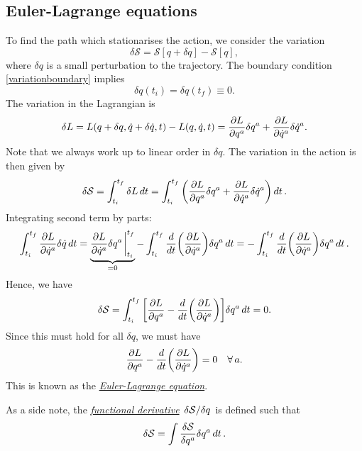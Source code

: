 \documentclass{article}
\begin{document}
\subsection{Euler-Lagrange equations}
To find the path which stationarises the action, we consider the variation
\begin{equation}
    \delta \mathcal{S} = \mathcal{S}[q + \delta q] - \mathcal{S}[q],
\end{equation}
where $\delta q$ is a small perturbation to the trajectory. The boundary condition \eqref{variationboundary} implies
\begin{equation}
    \delta q(t_i) = \delta q(t_f) \equiv 0.
\end{equation}
The variation in the Lagrangian is
\begin{equation}
    \delta L = L(q+\delta q, \dot{q} + \delta \dot{q}, t) - L(q,\dot{q},t) = \pdv{L}{q^a} \delta q^a + \pdv{L}{\dot{q}^a}\delta \dot{q}^a.
\end{equation}
Note that we always work up to linear order in $ \delta q $. The variation in the action is then given by
\begin{equation}
    \delta \mathcal{S} = \int_{t_i}^{t_f} \delta L\dd{t} = \int_{t_i}^{t_f} \qty(\pdv{L}{q^a} \delta q^a + \pdv{L}{\dot{q}^a}\delta \dot{q}^a) \dd{t}.
\end{equation}
Integrating second term by parts:
\[
    \int_{t_i}^{t_f} \pdv{L}{\dot{q}^a} \delta \dot{q} \dd{t} = \underbrace{\pdv{L}{\dot{q}^a} \delta q^a \eval_{t_i}^{t_f}}_{=0} - \int_{t_i}^{t_f} \dv{}{t}\qty(\pdv{L}{\dot{q}^a}) \delta q^a \dd{t} = - \int_{t_i}^{t_f} \dv{}{t}\qty(\pdv{L}{\dot{q}^a}) \delta q^a \dd{t}.
\]
Hence, we have
\begin{equation}
    \delta \mathcal{S} = \int_{t_i}^{t_f} \qty[\pdv{L}{q^a} - \dv{t}\qty(\pdv{L}{\dot{q}^a})] \delta q^a \dd{t} = 0.
\end{equation}
Since this must hold for all $\delta q$, we must have
\begin{equation}
    \pdv{L}{q^a} - \dv{t}\qty(\pdv{L}{\dot{q}^a}) = 0 \quad \forall \, a.
\end{equation}
This is known as the \href{https://en.wikipedia.org/wiki/Action_(physics)#Euler–Lagrange_equations_for_the_action_integral}{\textit{Euler-Lagrange equation}}. 
\par
As a side note, the \href{https://en.wikipedia.org/wiki/Functional_derivative}{\textit{functional derivative}} $\fdv*{\mathcal{S}}{q}$ is defined such that
\begin{equation}
    \delta \mathcal{S} = \int \fdv{\mathcal{S}}{q^a} \delta q^a \dd{t}.
\end{equation}
\end{document}
